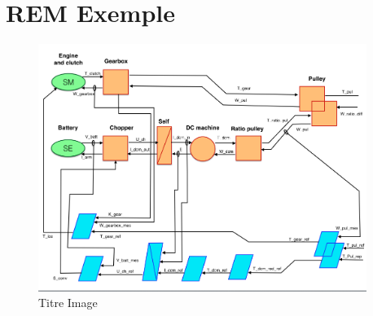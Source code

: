 	\appendix
	\appendixpage
	\addappheadtotoc
\section{REM Exemple}\FloatBarrier
\begin{figure}[ht]
\begin{center}
	\includegraphics[width=0.95\textwidth,angle=90]{images/REM1.png}
	\caption{Titre Image}\label{img:labelImg}
\end{center}
\end{figure}
\FloatBarrier